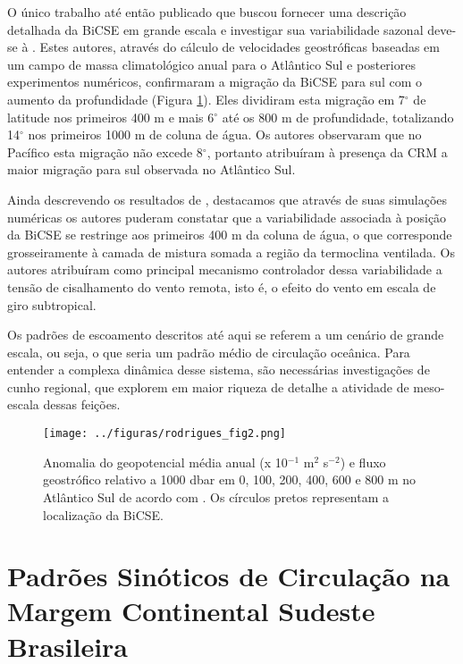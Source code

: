 O único trabalho até então publicado que buscou fornecer uma descrição detalhada da 
BiCSE em grande escala e investigar sua variabilidade sazonal deve-se à \cite{rodrigues_etal2006}. Estes autores, através
do cálculo de velocidades geostróficas baseadas em um campo de massa climatológico anual para o Atlântico Sul e posteriores 
experimentos numéricos, confirmaram a migração da BiCSE para sul com o aumento da profundidade (Figura \ref{fig:rodrigues}). Eles dividiram esta migração 
em 7$^\circ$ de latitude nos primeiros 400 m e mais 6$^\circ$ até os 800 m de profundidade, totalizando 14$^\circ$ nos primeiros
1000 m de coluna de água. Os autores observaram que no Pacífico esta migração não excede 8$^\circ$, portanto atribuíram
à presença da CRM a maior migração para sul observada no Atlântico Sul. 

Ainda descrevendo os resultados de \cite{rodrigues_etal2006}, destacamos que
através de suas simulações numéricas os autores puderam constatar que a variabilidade associada à posição da BiCSE se restringe aos 
primeiros 400 m da coluna de água, o que corresponde grosseiramente à camada de mistura somada a região da termoclina
ventilada. Os autores atribuíram como principal mecanismo controlador dessa variabilidade a tensão de cisalhamento do vento remota, 
isto é, o efeito do vento em escala de giro subtropical. 


Os padrões de escoamento descritos até aqui se referem a um cenário de 
grande escala, ou seja, o que seria um padrão médio de circulação oceânica. Para entender a complexa dinâmica desse sistema, 
são necessárias investigações de cunho regional, que explorem em maior riqueza
de detalhe a atividade de meso-escala dessas feições.

\begin{figure}%
 \begin{center}
  \texttt{[image: ../figuras/rodrigues\_fig2.png]}
 \end{center}
 \vspace{-.5cm}
 \renewcommand{\baselinestretch}{1}
 \caption{\label{fig:rodrigues} \small Anomalia do geopotencial média anual (x 10$^{-1}$ m$^2$ s$^{-2}$) e fluxo 
geostrófico relativo a 1000 dbar em 0, 100, 200, 400, 600 e 800 m no Atlântico Sul de acordo com \cite{rodrigues_etal2006}. Os círculos pretos representam a localização da Bi\-CSE.}
\end{figure}

\newpage

\section{Padrões Sinóticos de Circulação na Margem Continental Sudeste Brasileira}\label{sec:mesoesc}

